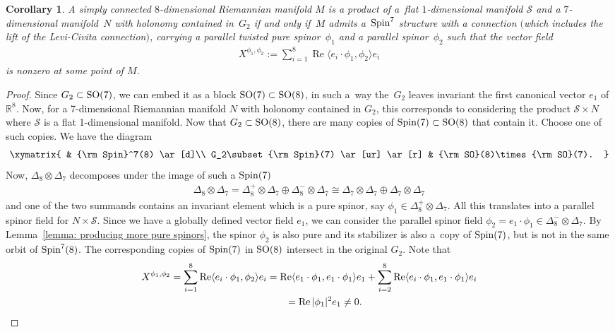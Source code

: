 \documentclass[pdftex]{sigma}
\numberwithin{equation}{section}
\newtheorem{Corollary}[Theorem]{Corollary}
\begin{document}
\begin{Corollary} A simply connected $8$-dimensional Riemannian manifold $M$ is a product of a~flat $1$-dimensional manifold $\mathcal{S}$ and a $7$-dimensional manifold~$N$ with holonomy contained in~$G_2$ if and only if~$M$ admits a~${\rm Spin}^7$ structure with a connection $($which includes the lift of the Levi-Civita connection$)$, carrying a parallel twisted pure spinor~$\phi_1$ and a parallel spinor~$\phi_2$ such that the vector field
\begin{gather*}X^{\phi_1,\phi_2}:=\sum_{i=1}^8 \operatorname{Re}\langle e_i\cdot \phi_1,\phi_2\rangle e_i\end{gather*}
is nonzero at some point of $M$.
\end{Corollary}
\begin{proof} Since $G_2\subset {\rm SO}(7)$, we can embed it as a block ${\rm SO}(7)\subset {\rm SO}(8)$, in such a~way the~$G_2$ leaves invariant the first canonical vector $e_1$ of $\mathbb{R}^8$. Now, for a 7-dimensional Riemannian manifold $N$ with holonomy contained in $G_2$, this corresponds to considering the product $\mathcal{S}\times N $ where $\mathcal{S}$ is a flat 1-dimensional manifold. Now that $G_2\subset {\rm SO}(8)$, there are many copies of ${\rm Spin}(7)\subset {\rm SO}(8)$ that contain it. Choose one of such copies. We have the diagram
\begin{gather*}
\xymatrix{
 & {\rm Spin}^7(8) \ar[d]\\
G_2\subset {\rm Spin}(7) \ar[ur] \ar[r] & {\rm SO}(8)\times {\rm SO}(7).
}
\end{gather*}
Now, $\Delta_8\otimes\Delta_7$ decomposes under the image of such a ${\rm Spin}(7)$
\begin{gather*}
\Delta_8\otimes\Delta_7 =\Delta_8^+\otimes\Delta_7\oplus\Delta_8^-\otimes\Delta_7\cong\Delta_7\otimes\Delta_7\oplus\Delta_7\otimes\Delta_7
\end{gather*}
and one of the two summands contains an invariant element which is a pure spinor, say $\phi_1\in\Delta_8^+\otimes\Delta_7$. All this translates into a parallel spinor field for $N\times\mathcal{S}$. Since we have a globally defined vector field $e_1$, we can consider the parallel spinor field $\phi_2=e_1\cdot \phi_1\in\Delta_8^-\otimes \Delta_7$. By Lemma~\ref{lemma: producing more pure spinors}, the spinor $\phi_2$ is also pure and its stabilizer is also a~copy of ${\rm Spin}(7)$, but is not in the same orbit of ${\rm Spin}^7(8)$. The corresponding copies of ${\rm Spin}(7)$ in ${\rm SO}(8)$ intersect in the original $G_2$. Note that
\begin{gather*}
X^{\phi_1,\phi_2} =\sum_{i=1}^8 \operatorname{Re}\langle e_i\cdot \phi_1,\phi_2\rangle e_i
= \operatorname{Re}\langle e_1\cdot \phi_1,e_1\cdot\phi_1\rangle e_1 + \sum_{i=2}^8 \operatorname{Re}\langle e_i\cdot \phi_1,e_1\cdot\phi_1\rangle e_i\\
\hphantom{X^{\phi_1,\phi_2}}{} = \operatorname{Re} |\phi_1|^2e_1\not = 0.
\end{gather*}


\end{proof}
\end{document}
